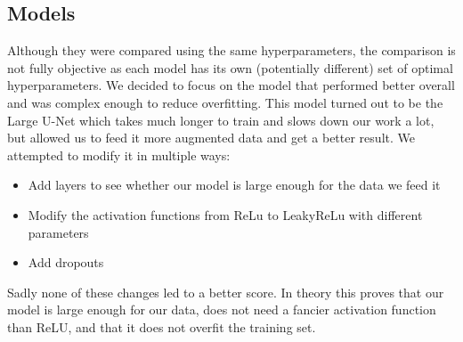 \documentclass[10pt,conference,compsocconf]{IEEEtran}
\begin{document}
\subsection{Models}
Although they were compared using the same hyperparameters, the comparison is not fully objective as each model has its own (potentially different) set of optimal hyperparameters. We decided to focus on the model that performed better overall and was complex enough to reduce overfitting. This model turned out to be the Large U-Net which takes much longer to train and slows down our work a lot, but allowed us to feed it more augmented data and get a better result.
\newline
We attempted to modify it in multiple ways: 
\begin{itemize}
\item Add layers to see whether our model is large enough for the data we feed it
\item Modify the activation functions from ReLu to LeakyReLu with different parameters
\item Add dropouts
\end{itemize}
Sadly none of these changes led to a better score. In theory this proves that our model is large enough for our data, does not need a fancier activation function than ReLU, and that it does not overfit the training set.
\end{document}
